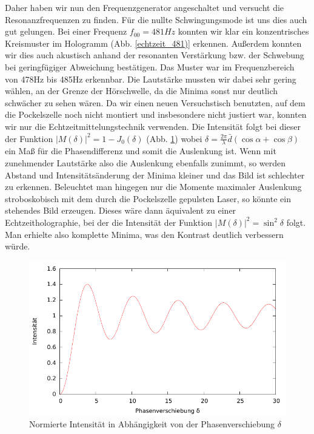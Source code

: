 Daher haben wir nun den Frequenzgenerator angeschaltet und versucht die Resonanzfrequenzen zu finden. Für die nullte Schwingungsmode ist uns dies auch gut gelungen. Bei einer Frequenz $f_{00} = 481 Hz$ konnten wir klar ein konzentrisches Kreismuster im Hologramm (Abb. \ref{echtzeit_481)} erkennen. Außerdem konnten wir dies auch akustisch anhand der resonanten Verstärkung bzw. der Schwebung bei geringfügiger Abweichung bestätigen. Das Muster war im Frequenzbereich von 478Hz bis 485Hz erkennbar. Die Lautstärke mussten wir dabei sehr gering wählen, an der Grenze der Hörschwelle, da die Minima sonst nur deutlich schwächer zu sehen wären. Da wir einen neuen Versuchstisch benutzten, auf dem die Pockelszelle noch nicht montiert und insbesondere nicht justiert war, konnten wir nur die Echtzeitmittelungstechnik verwenden. Die Intensität folgt bei dieser der Funktion $|M(\delta)|^2 = 1 - J_0(\delta)$ (Abb. \ref{echtzeit_intensität}) wobei $\delta = \frac{2\pi}{\lambda}\bar{d}(\cos \alpha + \cos \beta)$ ein Maß für die Phasendifferenz und somit die Auslenkung ist. Wenn mit zunehmender Lautstärke also die Auslenkung ebenfalls zunimmt, so werden Abstand und Intensitätsänderung der Minima kleiner und das Bild ist schlechter zu erkennen. Beleuchtet man hingegen nur die Momente maximaler Auslenkung stroboskobisch mit dem durch die Pockelszelle gepulsten Laser, so könnte ein stehendes Bild erzeugen. Dieses wäre dann äquivalent zu einer Echtzeitholographie, bei der die Intensität der Funktion $|M(\delta)|^2 = \sin^2 \delta$ folgt. Man erhielte also komplette Minima, was den Kontrast deutlich verbessern würde.

\begin{figure}[H]
\includegraphics[width=\textwidth]{Graphen/echtzeitmittelung.pdf}
\caption{Normierte Intensität in Abhängigkeit von der Phasenverschiebung $\delta$}
\label{echtzeit_intensität}
\end{figure}
